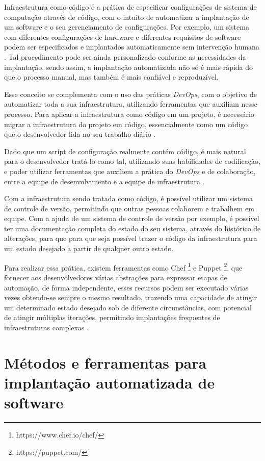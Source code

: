 Infraestrutura como código é a prática de especificar configurações de
sistema de computação através de código, com o intuito de automatizar a implantação
de um software e o seu gerenciamento de configurações. Por exemplo, um sistema
com diferentes configurações de hardware e diferentes
requisitos de software podem ser especificados e implantados automaticamente
sem intervenção humana \cite{configurationcodesmell}. Tal procedimento pode ser
ainda personalizado conforme as necessidades da implantação, sendo assim, a implantação
automatizada não só é mais rápida do que o processo manual, mas também é mais
confiável e reproduzível.

Esse conceito se complementa com o uso das práticas \textit{DevOps}, com o objetivo
de automatizar toda a sua infraestrutura, utilizando ferramentas que auxiliam nesse
processo. Para aplicar a infraestrutura como código em um projeto, é necessário
migrar a infraestrutura do projeto em código, essencialmente como um
código que o desenvolvedor lida no seu trabalho diário \cite{byhand}.

Dado que um script de configuração realmente contém código, é mais natural
para o desenvolvedor tratá-lo como tal, utilizando suas habilidades de codificação,
e poder utilizar ferramentas que auxiliem a prática do \textit{DevOps} e de colaboração,
entre a equipe de desenvolvimento e a equipe de infraestrutura \cite{byhand}. 

Com a infraestrutura sendo tratada como código, é possível utilizar um
sistema de controle de versão, permitindo que outras pessoas colaborem e trabalhem em
equipe. Com a ajuda de um sistema de controle de versão  por exemplo, é possível 
ter uma documentação completa do estado do seu sistema, 
através do histórico de alterações, para que para que seja possível
trazer o código da infraestrutura para um estado desejado a partir de
qualquer outro estado.

Para realizar essa prática, existem ferramentas como Chef \footnote{https://www.chef.io/chef/} e 
Puppet \footnote{https://puppet.com/}, que
fornecer aos desenvolvedores várias abstrações para expressar etapas de automação,
de forma independente, esses recursos podem ser executado várias vezes
obtendo-se sempre o mesmo resultado, trazendo uma capacidade de atingir um determinado
estado desejado sob de diferente circunstâncias, com potencial de atingir
múltiplas iterações, permitindo implantações frequentes de infraestruturas complexas
\cite{Hummer2013}.

\section{Métodos e ferramentas para implantação automatizada de software}
\label{subsec:metodoseferramentas}


